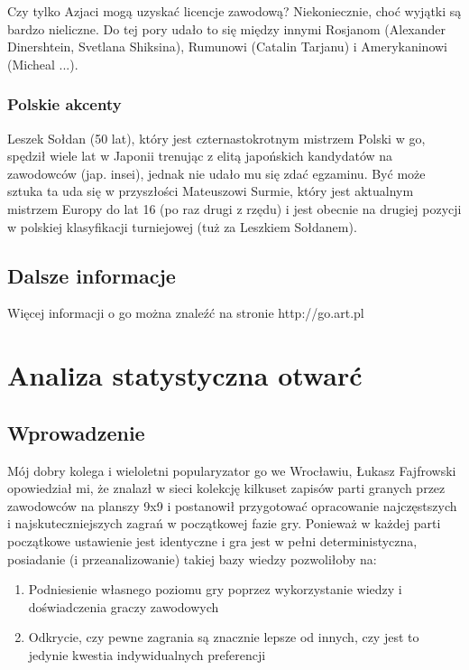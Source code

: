 \documentclass[11pt,leqno]{article}
\begin{document}
Czy tylko Azjaci mogą uzyskać licencje zawodową? Niekoniecznie, choć wyjątki są bardzo nieliczne. Do tej pory udało
to się między innymi Rosjanom (Alexander Dinershtein, Svetlana Shiksina), Rumunowi (Catalin Tarjanu) i Amerykaninowi 
(Micheal ...). 

\subsubsection{Polskie akcenty}

Leszek Sołdan (50 lat), który jest czternastokrotnym mistrzem Polski w go, spędził wiele lat w Japonii 
trenując z elitą japońskich kandydatów na zawodowców (jap. insei), jednak nie udało mu się zdać egzaminu. Być może sztuka 
ta uda się w przyszłości Mateuszowi Surmie, który jest aktualnym mistrzem Europy do lat 16 (po raz drugi z rzędu) i jest 
obecnie na drugiej pozycji w polskiej klasyfikacji turniejowej (tuż za Leszkiem Sołdanem).

\subsection{Dalsze informacje}

Więcej informacji o go można znaleźć na stronie http://go.art.pl

\section{Analiza statystyczna otwarć}

\subsection{Wprowadzenie}

Mój dobry kolega i wieloletni popularyzator go we Wrocławiu, Łukasz Fajfrowski opowiedział mi, że znalazł w sieci kolekcję 
kilkuset zapisów parti granych przez zawodowców na planszy 9x9 i postanowił przygotować opracowanie najczęstszych i 
najskuteczniejszych zagrań w początkowej fazie gry. Ponieważ w każdej parti początkowe ustawienie jest identyczne i gra
jest w pełni deterministyczna, posiadanie (i przeanalizowanie) takiej bazy wiedzy pozwoliłoby na:

\begin{enumerate}
\item Podniesienie własnego poziomu gry poprzez wykorzystanie wiedzy i doświadczenia graczy zawodowych
\item Odkrycie, czy pewne zagrania są znacznie lepsze od innych, czy jest to jedynie kwestia indywidualnych preferencji
\end{enumerate}
\end{document}
